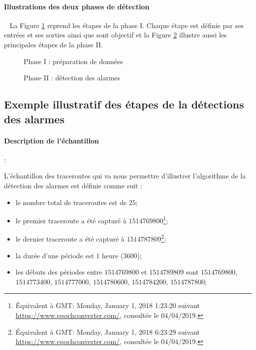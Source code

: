 \paragraph{ Illustrations des deux phases de détection}~
 La Figure  \ref{fig:step-preparing-data} reprend les étapes de la phase I. Chaque étape est définie par ses entrées et
ses sorties ainsi que sont objectif et
la Figure \ref{fig:step-detection-anomalies} illustre aussi les principales étapes  de la phase II.
\newpage

\begin{figure}[H]
	\centering
	\captionsetup{justification=centering}
	\resizebox{!}{\textheight}{
		
	}
	\caption{Phase I : préparation de données }
	\label{fig:step-preparing-data}
\end{figure}

\begin{figure}[H]
	\centering
	\captionsetup{justification=centering}
	\resizebox{\textwidth}{\textheight}{
		
	}
	\caption{Phase II : détection des alarmes }
	\label{fig:step-detection-anomalies}
\end{figure}

\subsection{Exemple illustratif des étapes de la détections des alarmes}

\paragraph{Description de  l'échantillon} :

L'échantillon des traceroutes qui va nous permettre d'illustrer l'algorithme de la détection des alarmes est définie comme suit :

\begin{itemize}
	\item le nombre total de traceroutes est de $25$;
	\item le premier traceroute a été capturé à $1514769800$\footnote{Équivalent à GMT: Monday, January 1, 2018 1:23:20 suivant \url{https://www.epochconverter.com/}, consultée le $04/04/2019$.};
	\item le dernier traceroute a été capturé à $1514787809$\footnote{Équivalent à GMT: Monday, January 1, 2018 6:23:29 suivant \url{https://www.epochconverter.com/}, consultée le $04/04/2019$.};
	\item la durée d'une période est $1$ heure ($3600$);
	\item les débuts des périodes entre $ 1514769800 $ et $ 1514789809 $ sont  $ 1514769800 $, $ 1514773400 $, $ 1514777000 $, $ 1514780600 $, $ 1514784200 $, $ 1514787800 $;
\end{itemize} 



